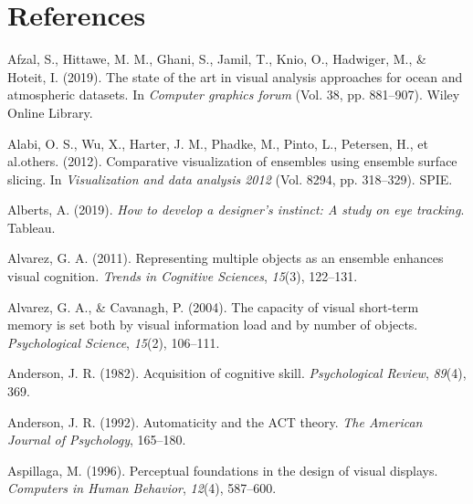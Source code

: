 \documentclass[print]{nuthesis}
\newlength{\cslhangindent}
\newenvironment{CSLReferences}[2]%
{\setlength{\parindent}{0pt}%
\everypar{\setlength{\hangindent}{\cslhangindent}}\ignorespaces}%
{\par}
\begin{document}
\backmatter

\hypertarget{references}{%
\chapter*{References}\label{references}}

\noindent

\setlength{\parindent}{-0.20in}
\setlength{\leftskip}{0.20in}
\setlength{\parskip}{8pt}

\hypertarget{refs}{}
\begin{CSLReferences}{1}{0}
\leavevmode{}%
Afzal, S., Hittawe, M. M., Ghani, S., Jamil, T., Knio, O., Hadwiger, M., \& Hoteit, I. (2019). The state of the art in visual analysis approaches for ocean and atmospheric datasets. In \emph{Computer graphics forum} (Vol. 38, pp. 881--907). Wiley Online Library.

\leavevmode{}%
Alabi, O. S., Wu, X., Harter, J. M., Phadke, M., Pinto, L., Petersen, H., et al.others. (2012). Comparative visualization of ensembles using ensemble surface slicing. In \emph{Visualization and data analysis 2012} (Vol. 8294, pp. 318--329). SPIE.

\leavevmode{}%
Alberts, A. (2019). \emph{How to develop a designer's instinct: A study on eye tracking}. Tableau.

\leavevmode{}%
Alvarez, G. A. (2011). Representing multiple objects as an ensemble enhances visual cognition. \emph{Trends in Cognitive Sciences}, \emph{15}(3), 122--131.

\leavevmode{}%
Alvarez, G. A., \& Cavanagh, P. (2004). The capacity of visual short-term memory is set both by visual information load and by number of objects. \emph{Psychological Science}, \emph{15}(2), 106--111.

\leavevmode{}%
Anderson, J. R. (1982). Acquisition of cognitive skill. \emph{Psychological Review}, \emph{89}(4), 369.

\leavevmode{}%
Anderson, J. R. (1992). Automaticity and the ACT theory. \emph{The American Journal of Psychology}, 165--180.

\leavevmode{}%
Aspillaga, M. (1996). Perceptual foundations in the design of visual displays. \emph{Computers in Human Behavior}, \emph{12}(4), 587--600.


\end{CSLReferences}
\end{document}

